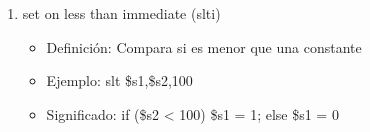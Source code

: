 \documentclass{article}
\begin{document}
\begin{enumerate}
    \item set on less than immediate (slti)
    \begin{itemize}
        \item Definición: Compara si es menor que una constante
        \item Ejemplo: slt \$s1,\$s2,100
        \item Significado: if (\$s2 < 100) \$s1 = 1;
                           else \$s1 = 0
    \end{itemize}
    
\end{enumerate}
\end{document}
